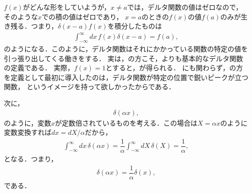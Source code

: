 \noindent
$f(x)$がどんな形をしていようが，$x\neq a$では，デルタ関数の値はゼロなので，そのような$x$での積の値はゼロであり，
$x=a$のときの$f(x)$の値$f(a)$のみが生き残る．つまり，$\delta(x-a)f(x)$を積分したものは
\begin{align}
  \int_{-\infty}^{\infty} dx\, f\left(x\right)\delta\left(x-a\right) = f\left(a\right), \label{delta_func_def_04} 
\end{align}
のようになる．このように，デルタ関数はそれにかかっている関数の特定の値を引っ張り出してくる働きをする．
実は，の方こそ，よりも基本的なデルタ関数の定義である．
実際，$f(x)=1$とすると，が得られる．
にも関わらず，の方を定義として最初に導入したのは，デルタ関数が特定の位置で鋭いピークが立つ関数，
というイメージを持って欲しかったからである．
%

次に，
\begin{align}
 \delta (\alpha x), 
\end{align}
のように，変数$x$が定数倍されているものを考える．この場合は$X=\alpha x$のように変数変換すれば$dx=dX/\alpha$だから，
\begin{align}
 \int_{-\infty}^{\infty}dx\,\delta(\alpha x) = \dfrac{1}{\alpha}\int_{-\infty}^{\infty}dX\,\delta (X) = \dfrac{1}{\alpha}, 
\end{align}
となる．つまり，
\begin{align}
 \delta(\alpha x) = \dfrac{1}{\alpha}\delta(x), 
\end{align}
である．
%
